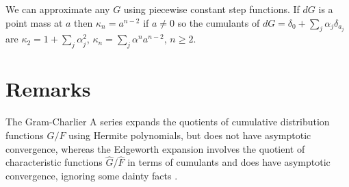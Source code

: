 \documentclass[11pt]{article}
\begin{document}
We can approximate any \(G\) using piecewise constant
step functions. If \(dG\) is a point mass at \(a\)
then \(\kappa_n = a^{n-2}\) if \(a\not=0\) so
the cumulants of \(dG = \delta_0 + \sum_j \alpha_j \delta_{a_j}\) are \(\kappa_2 = 1 + \sum_j \alpha_j^2\), \(\kappa_n = \sum_j \alpha^n a^{n - 2}\), \(n\ge2\).

%

\section{Remarks}
The Gram-Charlier A series expands the quotients of cumulative
distribution functions \(G/F\) using Hermite polynomials,
but does not have asymptotic convergence, whereas the Edgeworth expansion
involves the quotient of characteristic functions 
\(\hat G/\hat F\) in terms of cumulants and does have asymptotic convergence, ignoring some dainty facts \cite{Petrov}.
\end{document}
